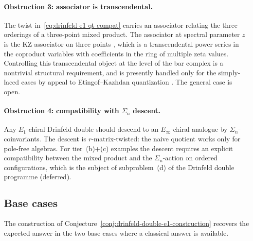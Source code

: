 \paragraph{Obstruction 3: associator is transcendental.}
The twist in~\eqref{eq:drinfeld-e1-qt-compat} carries an
associator relating the three orderings of a three-point
mixed product. The associator at spectral parameter $z$
is the KZ associator on three points
\cite{Drinfeld90}, which is a transcendental power series
in the coproduct variables with coefficients in the ring
of multiple zeta values. Controlling this transcendental
object at the level of the bar complex is a nontrivial
structural requirement, and is presently handled only
for the simply-laced cases by appeal to Etingof--Kazhdan
quantization \cite{etingof1996quantization}. The
general case is open.

\paragraph{Obstruction 4: compatibility with $\Sigma_n$
descent.} Any $E_1$-chiral Drinfeld double should descend
to an $E_\infty$-chiral analogue by $\Sigma_n$-coinvariants.
The descent is $r$-matrix-twisted: the naive
quotient works only for pole-free algebras. For
tier~(b)+(c) examples the descent requires an explicit
compatibility between the mixed product and the
$\Sigma_n$-action on ordered configurations, which is
the subject of subproblem~(d) of the Drinfeld double
programme (deferred).

\subsection{Base cases}
\label{subsec:drinfeld-e1-base-cases}

The construction of
Conjecture~\ref{conj:drinfeld-double-e1-construction}
recovers the expected answer in the two base cases where a
classical answer is available.

